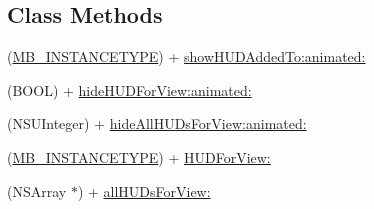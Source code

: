 \subsection*{Class Methods}
\begin{DoxyCompactItemize}
\item 
(\hyperlink{_m_b_progress_h_u_d_8h_a3b2863c8570213ff818b8e2361014d34}{M\+B\+\_\+\+I\+N\+S\+T\+A\+N\+C\+E\+T\+Y\+P\+E}) + \hyperlink{interface_m_b_progress_h_u_d_a85d0c8c9647c47a289e7e7ea5d477c9a}{show\+H\+U\+D\+Added\+To\+:animated\+:}
\item 
(B\+O\+O\+L) + \hyperlink{interface_m_b_progress_h_u_d_ab7a06aebc0d49b4fc963815ad424013f}{hide\+H\+U\+D\+For\+View\+:animated\+:}
\item 
(N\+S\+U\+Integer) + \hyperlink{interface_m_b_progress_h_u_d_a86053d76e84d0fdf033af091df5ea239}{hide\+All\+H\+U\+Ds\+For\+View\+:animated\+:}
\item 
(\hyperlink{_m_b_progress_h_u_d_8h_a3b2863c8570213ff818b8e2361014d34}{M\+B\+\_\+\+I\+N\+S\+T\+A\+N\+C\+E\+T\+Y\+P\+E}) + \hyperlink{interface_m_b_progress_h_u_d_a30afd912f412c6612eee7f1e17241b5b}{H\+U\+D\+For\+View\+:}
\item 
(N\+S\+Array $\ast$) + \hyperlink{interface_m_b_progress_h_u_d_aaa8882a53b5edfd617b4ba112c60811b}{all\+H\+U\+Ds\+For\+View\+:}
\end{DoxyCompactItemize}
